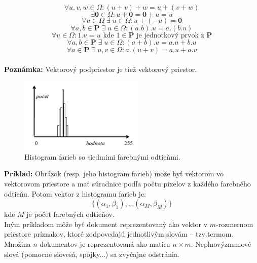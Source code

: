 \documentclass[12pt,oneside]{fithesis2}
\begin{document}
\begin{equation*}
\forall u,v,w \in \Omega : (u + v)+w = u+(v+w) 
\end{equation*}
\begin{equation*}
\exists\mathbf{0} \in \Omega : u+\mathbf{0} = \mathbf{0}+u = u
\end{equation*}
\begin{equation*}
\forall u \in \Omega \; \exists \; u \in \Omega : u+(-u)  = \mathbf{0}
\end{equation*}
\begin{equation*}
\forall a,b \in \mathbf{P} \; \exists \; u \in \Omega : (a.b).u = a.(b.u) 
\end{equation*}
\begin{equation*}
\forall u \in \Omega : 1.u=u  \textrm{ kde } 1 \in \mathbf{P}  \textrm{ je jednotkový prvok z } \mathbf{P} 
\end{equation*}
\begin{equation*}
\forall a,b \in \mathbf{P} \; \exists \;u \in \Omega : (a+b).u = a.u + b.u 
\end{equation*}
\begin{equation*}
\forall a \in \mathbf{P} \; \exists \;u,v \in \Omega : a.(u+v) = a.u + a.v 
\end{equation*} \\
\textbf{Poznámka:} Vektorový podpriestor je tiež vektorový priestor.

\begin{figure}
  \centering
  \includegraphics[width=6cm]{obr/gis_histogram_obrazu.png}
  \caption{Histogram farieb so siedmimi farebnými odtieňmi.}
  \label{fig:triangle}
\end{figure}  

\textbf{Príklad:}
Obrázok (resp. jeho histogram farieb) može byť vektorom vo vektorovom priestore a mať súradnice podľa počtu pixelov z každého farebného odtieňu.
Potom vektor z histogramu farieb je:
\begin{equation}
\{(\alpha_1,\beta_1),...(\alpha_M,\beta_M)\}
\end{equation}
kde $M$ je počet farebných odtieňov. \\
Iným príkladom môže byť dokument reprezentovaný ako
vektor v $m$-rozmernom priestore príznakov, ktoré zodpovedajú jednotlivým slovám – tzv.termom. Množina $n$ dokumentov je reprezentovaná ako matica $n\times m$. Neplnovýznamové slová (pomocne slovesá, spojky...) sa zvyčajne odstránia. \cite{vectorspace}
\end{document}
